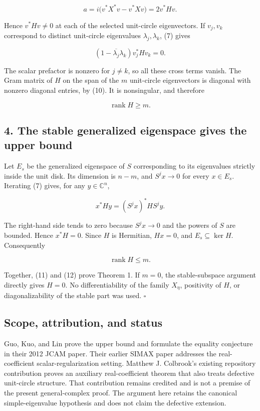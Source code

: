 \documentclass[10pt,a4paper]{article}
\begin{document}
\[
a=i\bigl(v^*X^*v-v^*Xv\bigr)=2v^*Hv. \tag{10}
\]

Hence \(v^*Hv\ne0\) at each of the selected unit-circle eigenvectors. If
\(v_j,v_k\) correspond to distinct unit-circle eigenvalues
\(\lambda_j,\lambda_k\), (7) gives

\[
(1-\overline{\lambda_j}\lambda_k)v_j^*Hv_k=0.
\]

The scalar prefactor is nonzero for \(j\ne k\), so all these cross terms
vanish. The Gram matrix of \(H\) on the span of the \(m\) unit-circle
eigenvectors is diagonal with nonzero diagonal entries, by (10). It is
nonsingular, and therefore

\[
\operatorname{rank}H\geq m. \tag{11}
\]

\subsection{4. The stable generalized eigenspace gives the upper
bound}\label{the-stable-generalized-eigenspace-gives-the-upper-bound}

Let \(E_s\) be the generalized eigenspace of \(S\) corresponding to its
eigenvalues strictly inside the unit disk. Its dimension is \(n-m\), and
\(S^j x\to0\) for every \(x\in E_s\). Iterating (7) gives, for any
\(y\in\mathbb C^n\),

\[
x^*Hy=(S^j x)^*H S^j y.
\]

The right-hand side tends to zero because \(S^j x\to0\) and the powers
of \(S\) are bounded. Hence \(x^*H=0\). Since \(H\) is Hermitian,
\(Hx=0\), and \(E_s\subseteq\ker H\). Consequently

\[
\operatorname{rank}H\leq m. \tag{12}
\]

Together, (11) and (12) prove Theorem 1. If \(m=0\), the stable-subspace
argument directly gives \(H=0\). No differentiability of the family
\(X_\eta\), positivity of \(H\), or diagonalizability of the stable part
was used. \(\square\)

\subsection{Scope, attribution, and
status}\label{scope-attribution-and-status}

Guo, Kuo, and Lin prove the upper bound and formulate the equality
conjecture in their 2012 JCAM paper. Their earlier SIMAX paper addresses
the real-coefficient scalar-regularization setting. Matthew J.
Colbrook's existing repository contribution proves an auxiliary
real-coefficient theorem that also treats defective unit-circle
structure. That contribution remains credited and is not a premise of
the present general-complex proof. The argument here retains the
canonical simple-eigenvalue hypothesis and does not claim the defective
extension.
\end{document}
